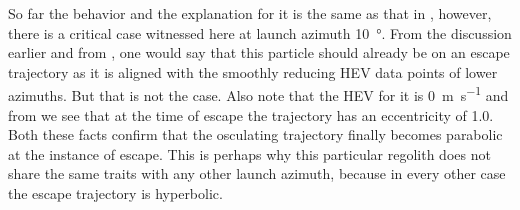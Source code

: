 %
\newline\newline
%
So far the behavior and the explanation for it is the same as that in , however, there is a critical case witnessed here at launch azimuth \SI{10}{\degree}. From the discussion earlier and from , one would say that this particle should already be on an escape trajectory as it is aligned with the smoothly reducing \gls{HEV} data points of lower azimuths. But that is not the case. Also note that the \gls{HEV} for it is \SI{0}{\metre\per\second} and from  we see that at the time of escape the trajectory has an eccentricity of 1.0. Both these facts confirm that the osculating trajectory finally becomes parabolic at the instance of escape. This is perhaps why this particular regolith does not share the same traits with any other launch azimuth, because in every other case the escape trajectory is hyperbolic.
